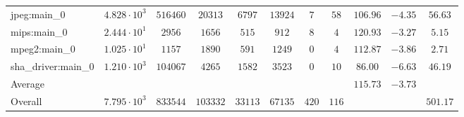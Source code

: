 \begin{tabular}{|l|c|c|c|c|c|c|c|c|c|c|}
jpeg:main\_0            & $ 4.828 \cdot 10^{3} $ & $ 516460 $ & $ 20313  $ & $ 6797  $ & $ 13924 $ & $ 7   $ & $ 58  $ & $ 106.96      $ & $ -4.35   $ & $ 56.63   $ \\
mips:main\_0            & $ 2.444 \cdot 10^{1} $ & $ 2956   $ & $ 1656   $ & $ 515   $ & $ 912   $ & $ 8   $ & $ 4   $ & $ 120.93      $ & $ -3.27   $ & $ 5.15    $ \\
mpeg2:main\_0           & $ 1.025 \cdot 10^{1} $ & $ 1157   $ & $ 1890   $ & $ 591   $ & $ 1249  $ & $ 0   $ & $ 4   $ & $ 112.87      $ & $ -3.86   $ & $ 2.71    $ \\
sha\_driver:main\_0     & $ 1.210 \cdot 10^{3} $ & $ 104067 $ & $ 4265   $ & $ 1582  $ & $ 3523  $ & $ 0   $ & $ 10  $ & $ 86.00       $ & $ -6.63   $ & $ 46.19   $ \\
\hline
Average                 & $                    $ & $        $ & $        $ & $       $ & $       $ & $     $ & $     $ & $ 115.73      $ & $ -3.73   $ & $         $ \\
\hline
Overall                 & $ 7.795 \cdot 10^{3} $ & $ 833544 $ & $ 103332 $ & $ 33113 $ & $ 67135 $ & $ 420 $ & $ 116 $ & $             $ & $         $ & $ 501.17  $ \\
\hline
\end{tabular}

